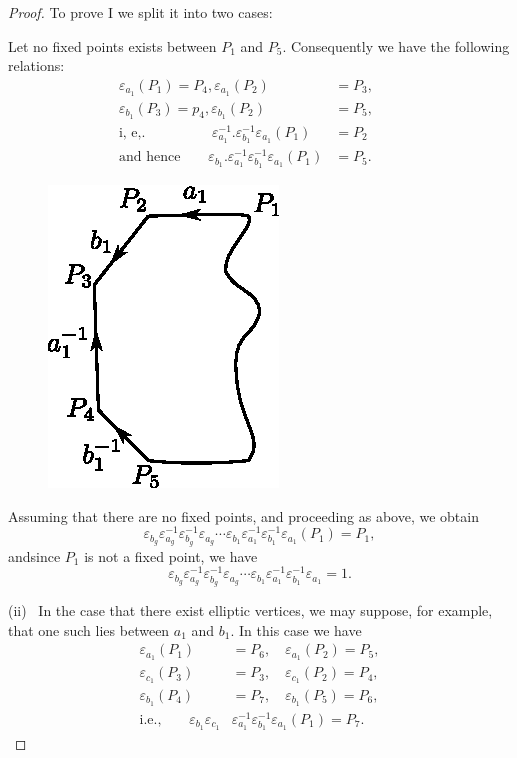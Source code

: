 \begin{proof}
To prove I we split it into two cases:

Let no fixed points exists between $P_1$ and $P_5$. Consequently we
have the following relations: 
\begin{align*}
  \varepsilon_{a_1} (P_1)  = P_4, \varepsilon_{a_1} (P_2) &= P_3, \\
  \varepsilon_{b_1} (P_3)  = p_4,  \varepsilon_{b_1} (P_2) & = P_5, \\
  \text{i, e,.}  \hspace{2cm}\varepsilon^{-1}_{a_1}.  \varepsilon_{b_1}^{-1}
  \varepsilon_{a_1}(P_1) & = P_2\hspace{1cm}\\  
  \text{and hence}\qquad \varepsilon_{b_1}.
  \varepsilon^{-1}_{a_1} \varepsilon_{b_1}^{-1} 
  \varepsilon_{a_1} (P_1) & = P_5.
\end{align*}

  \begin{figure}[H]
    \centerline{\includegraphics{vol9-figures/fig9-4.eps}}
  \end{figure}

Assuming that there are no fixed points, and proceeding as above, we obtain
$$
\varepsilon_{b_g} \varepsilon_{a_g}^{-1}
\varepsilon_{b_g}^{-1}\varepsilon_{a_g} \cdots 
\varepsilon_{b_1} \varepsilon_{a_1}^{-1} \varepsilon_{b_1}^{-1}
\varepsilon_{a_1} (P_1)= P_1,  
$$
and\pageoriginale since $P_1$ is not a fixed point, we have
$$
\varepsilon_{b_g}\varepsilon_{a_g}^{-1} \varepsilon_{b_g}^{-1}
\varepsilon_{a_g} \cdots \varepsilon_{b_1}\varepsilon_{a_1}^{-1}
\varepsilon_{b_1}^{-1} \varepsilon_{a_1} = 1.  
$$

(ii)~ In the case that there exist elliptic vertices, we may suppose,
for example, that one such lies between $a_1$ and $b_1$. In this case
we have  
\begin{align*}
  \varepsilon_{a_1} (P_1) & = P_6, \quad \varepsilon_{a_1} (P_2) = P_5, \\
  \varepsilon_{c_1} (P_3) & = P_3, \quad \varepsilon_{c_1} (P_2) = P_4, \\
  \varepsilon_{b_1} (P_4) & = P_7, \quad \varepsilon_{b_1} (P_5) = P_6, \\ 
  \text{i.e.,}  \qquad \varepsilon_{b_1} \varepsilon_{c_1} & \varepsilon_{a_1}^{-1}
\varepsilon_{b_1}^{-1} \varepsilon_{a_1} (P_1) = P_7.  
\end{align*}


\end{proof}
